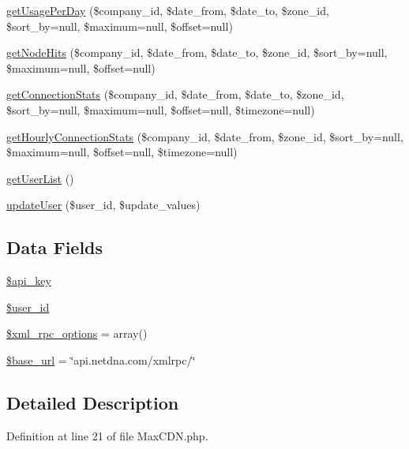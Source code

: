 \begin{DoxyCompactItemize}
\hyperlink{class_max_c_d_n_a0f0f34de0a9b9e8aee763a10620b0310}{getUsagePerDay} (\$company\_\-id, \$date\_\-from, \$date\_\-to, \$zone\_\-id, \$sort\_\-by=null, \$maximum=null, \$offset=null)
\item 
\hyperlink{class_max_c_d_n_a5edac3917b1fc456d9919a2b27954032}{getNodeHits} (\$company\_\-id, \$date\_\-from, \$date\_\-to, \$zone\_\-id, \$sort\_\-by=null, \$maximum=null, \$offset=null)
\item 
\hyperlink{class_max_c_d_n_a0ccdaad45884b8d37ec214a9fef96f69}{getConnectionStats} (\$company\_\-id, \$date\_\-from, \$date\_\-to, \$zone\_\-id, \$sort\_\-by=null, \$maximum=null, \$offset=null, \$timezone=null)
\item 
\hyperlink{class_max_c_d_n_a6a37fba9236e945837fdab2615463fd8}{getHourlyConnectionStats} (\$company\_\-id, \$date\_\-from, \$zone\_\-id, \$sort\_\-by=null, \$maximum=null, \$offset=null, \$timezone=null)
\item 
\hyperlink{class_max_c_d_n_aeb20dee182d29e6d339cab9682b4ff04}{getUserList} ()
\item 
\hyperlink{class_max_c_d_n_a1d86f2ee4963b6bfeb447979f58e8e0e}{updateUser} (\$user\_\-id, \$update\_\-values)
\end{DoxyCompactItemize}
\subsection*{Data Fields}
\begin{DoxyCompactItemize}
\item 
\hyperlink{class_max_c_d_n_a186dfe06d14a3bc248c4eb4bcdaec562}{\$api\_\-key}
\item 
\hyperlink{class_max_c_d_n_af0fcd925f00973e32f7214859dfb3c6b}{\$user\_\-id}
\item 
\hyperlink{class_max_c_d_n_aa9300810e8d9adff7d3fdc176c218363}{\$xml\_\-rpc\_\-options} = array()
\item 
\hyperlink{class_max_c_d_n_a6886427c9c643f707fcb35c018049bc7}{\$base\_\-url} = \char`\"{}api.netdna.com/xmlrpc/\char`\"{}
\end{DoxyCompactItemize}


\subsection{Detailed Description}


Definition at line 21 of file MaxCDN.php.



